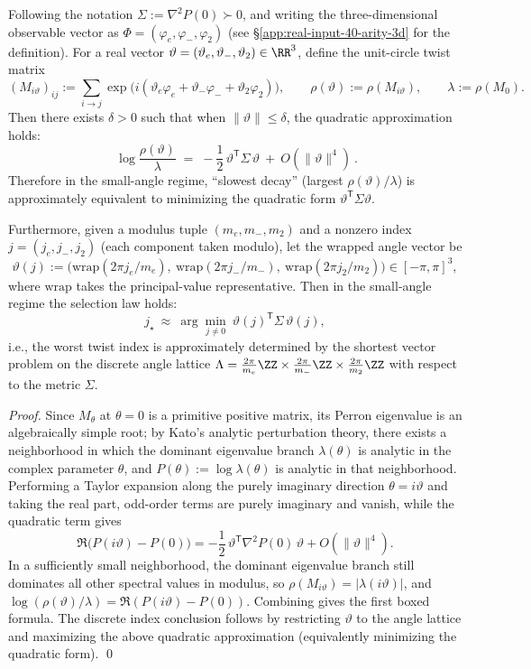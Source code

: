 \begin{theorem}\label{thm:real-input-40-near-coboundary-svp}
Following the notation \(\Sigma:=\nabla^2P(0)\succ 0\), and writing the three-dimensional observable vector as
\(
\Phi=(\varphi_e,\varphi_-,\varphi_2)
\) (see \S\ref{app:real-input-40-arity-3d} for the definition).
For a real vector \(\vartheta=(\vartheta_e,\vartheta_-,\vartheta_2)\in\RR^3\), define the unit-circle twist matrix
\[
(M_{i\vartheta})_{ij}:=\sum_{i\to j}\exp\bigl(i(\vartheta_e\varphi_e+\vartheta_-\varphi_-+\vartheta_2\varphi_2)\bigr),
\qquad
\rho(\vartheta):=\rho(M_{i\vartheta}),
\qquad
\lambda:=\rho(M_0).
\]
Then there exists \(\delta>0\) such that when \(\|\vartheta\|\le \delta\), the quadratic approximation holds:
\[
\boxed{\ \log\frac{\rho(\vartheta)}{\lambda}
\;=\;
-\frac{1}{2}\,\vartheta^{\mathsf T}\Sigma\,\vartheta\ +\ O(\|\vartheta\|^4)\ }.
\]
Therefore in the small-angle regime, ``slowest decay'' (largest \(\rho(\vartheta)/\lambda\)) is approximately equivalent to minimizing the quadratic form \(\vartheta^{\mathsf T}\Sigma\vartheta\).
\par
Furthermore, given a modulus tuple \((m_e,m_-,m_2)\) and a nonzero index \(j=(j_e,j_-,j_2)\) (each component taken modulo), let the wrapped angle vector be
\[
\vartheta(j):=\bigl(\mathrm{wrap}(2\pi j_e/m_e),\ \mathrm{wrap}(2\pi j_-/m_-),\ \mathrm{wrap}(2\pi j_2/m_2)\bigr)\in[-\pi,\pi]^3,
\]
where \(\mathrm{wrap}\) takes the principal-value representative. Then in the small-angle regime the selection law holds:
\[
j_\star\ \approx\ \arg\min_{j\neq 0}\ \vartheta(j)^{\mathsf T}\Sigma\,\vartheta(j),
\]
i.e., the worst twist index is approximately determined by the shortest vector problem on the discrete angle lattice
\(
\Lambda=\frac{2\pi}{m_e}\ZZ\times\frac{2\pi}{m_-}\ZZ\times\frac{2\pi}{m_2}\ZZ
\)
with respect to the metric \(\Sigma\).
\end{theorem}
\begin{proof}
Since \(M_\theta\) at \(\theta=0\) is a primitive positive matrix, its Perron eigenvalue is an algebraically simple root; by Kato's analytic perturbation theory, there exists a neighborhood in which the dominant eigenvalue branch \(\lambda(\theta)\) is analytic in the complex parameter \(\theta\), and \(P(\theta):=\log\lambda(\theta)\) is analytic in that neighborhood.
Performing a Taylor expansion along the purely imaginary direction \(\theta=i\vartheta\) and taking the real part, odd-order terms are purely imaginary and vanish, while the quadratic term gives
\[
\Re\bigl(P(i\vartheta)-P(0)\bigr)=-\frac12\,\vartheta^{\mathsf T}\nabla^2P(0)\,\vartheta+O(\|\vartheta\|^4).
\]
In a sufficiently small neighborhood, the dominant eigenvalue branch still dominates all other spectral values in modulus, so \(\rho(M_{i\vartheta})=|\lambda(i\vartheta)|\), and
\(
\log(\rho(\vartheta)/\lambda)=\Re(P(i\vartheta)-P(0))
\).
Combining gives the first boxed formula.
The discrete index conclusion follows by restricting \(\vartheta\) to the angle lattice and maximizing the above quadratic approximation (equivalently minimizing the quadratic form). \qed
\end{proof}

